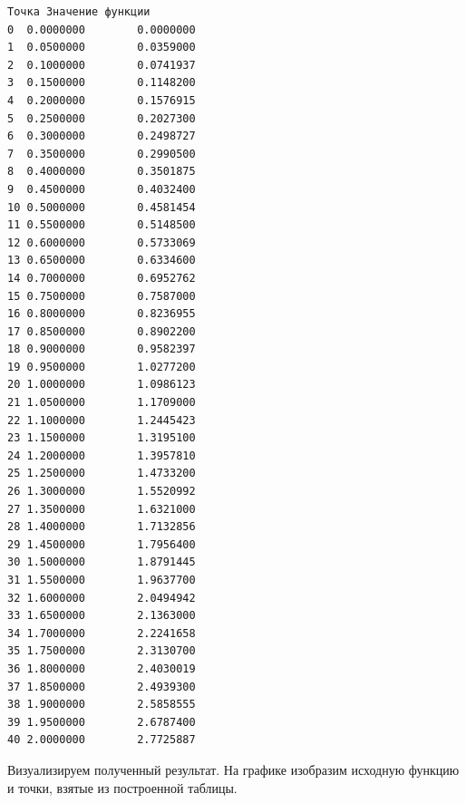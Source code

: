 \documentclass[11pt]{article}
\makeatletter
\newcommand{\boxspacing}{\kern\kvtcb@left@rule\kern\kvtcb@boxsep}
\newcommand{\prompt}[4]{
        {\ttfamily\llap{{\color{#2}[#3]:\hspace{3pt}#4}}\vspace{-\baselineskip}}
    }
\makeatother
\begin{document}
            \begin{tcolorbox}[breakable, size=fbox, boxrule=.5pt, pad at break*=1mm, opacityfill=0]
\prompt{Out}{outcolor}{58}{\boxspacing}
\begin{Verbatim}[commandchars=\\\{\}]
       Точка Значение функции
0  0.0000000        0.0000000
1  0.0500000        0.0359000
2  0.1000000        0.0741937
3  0.1500000        0.1148200
4  0.2000000        0.1576915
5  0.2500000        0.2027300
6  0.3000000        0.2498727
7  0.3500000        0.2990500
8  0.4000000        0.3501875
9  0.4500000        0.4032400
10 0.5000000        0.4581454
11 0.5500000        0.5148500
12 0.6000000        0.5733069
13 0.6500000        0.6334600
14 0.7000000        0.6952762
15 0.7500000        0.7587000
16 0.8000000        0.8236955
17 0.8500000        0.8902200
18 0.9000000        0.9582397
19 0.9500000        1.0277200
20 1.0000000        1.0986123
21 1.0500000        1.1709000
22 1.1000000        1.2445423
23 1.1500000        1.3195100
24 1.2000000        1.3957810
25 1.2500000        1.4733200
26 1.3000000        1.5520992
27 1.3500000        1.6321000
28 1.4000000        1.7132856
29 1.4500000        1.7956400
30 1.5000000        1.8791445
31 1.5500000        1.9637700
32 1.6000000        2.0494942
33 1.6500000        2.1363000
34 1.7000000        2.2241658
35 1.7500000        2.3130700
36 1.8000000        2.4030019
37 1.8500000        2.4939300
38 1.9000000        2.5858555
39 1.9500000        2.6787400
40 2.0000000        2.7725887
\end{Verbatim}
\end{tcolorbox}
        
    Визуализируем полученный результат. На графике изобразим исходную
функцию и точки, взятые из построенной таблицы.
\end{document}
